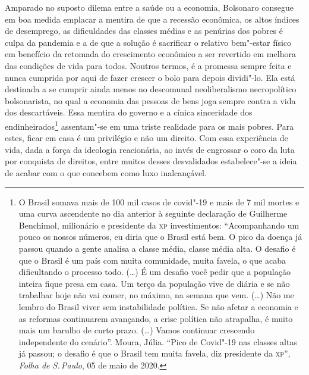 Amparado no suposto dilema entre a saúde ou a economia, Bolsonaro
consegue em boa medida emplacar a mentira de que a recessão econômica,
os altos índices de desemprego, as dificuldades das classes médias e as
penúrias dos pobres é culpa da pandemia e a de que a solução é
sacrificar o relativo bem"-estar físico em benefício da retomada do
crescimento econômico a ser revertido em melhora das condições de vida
para todos. Noutros termos, é a promessa sempre feita e nunca cumprida
por aqui de fazer crescer o bolo para depois dividi"-lo. Ela está
destinada a se cumprir ainda menos no descomunal neoliberalismo
necropolítico bolsonarista, no qual a economia das pessoas de bens joga
sempre contra a vida dos descartáveis. Essa mentira do governo e a
cínica sinceridade dos endinheirados\footnote{O Brasil somava mais de
  100 mil casos de covid"-19 e mais de 7 mil mortes e uma curva
  ascendente no dia anterior à seguinte declaração de Guilherme
  Benchimol, milionário e presidente da \textsc{xp} investimentos: ``Acompanhando
  um pouco os nossos números, eu diria que o Brasil está bem. O pico da
  doença já passou quando a gente analisa a classe média, classe média
  alta. O desafio é que o Brasil é um país com muita comunidade, muita
  favela, o que acaba dificultando o processo todo. (\ldots{}) É um desafio
  você pedir que a população inteira fique presa em casa. Um terço da
  população vive de diária e se não trabalhar hoje não vai comer, no
  máximo, na semana que vem. (\ldots{}) Não me lembro do Brasil viver sem
  instabilidade política. Se não afetar a economia e as reformas
  continuarem avançando, a crise política não atrapalha, é muito mais um
  barulho de curto prazo. (\ldots{}) Vamos continuar crescendo independente
  do cenário''. Moura, Júlia. ``Pico de Covid"-19 nas classes altas já
  passou; o desafio é que o Brasil tem muita favela, diz presidente da
  \textsc{xp}'', \emph{Folha de S.\,Paulo}, 05 de maio de 2020.}
assentam"-se em uma triste realidade para os mais pobres. Para estes,
ficar em casa é um privilégio e não um direito. Com essa experiência de
vida, dada a força da ideologia reacionária, ao invés de engrossar o
coro da luta por conquista de direitos, entre muitos desses desvalidados
estabelece"-se a ideia de acabar com o que concebem como luxo
inalcançável.

